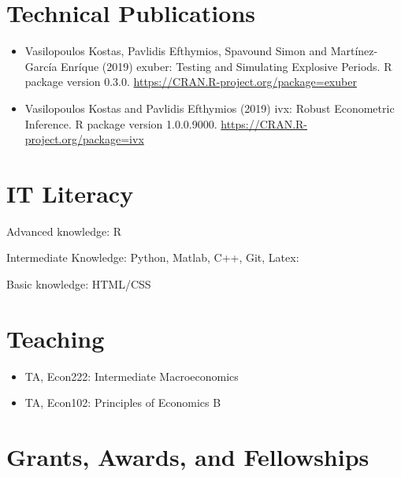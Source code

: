 \documentclass[10pt,]{article}
\begin{document}
              \hypertarget{technical-publications}{%
              \section{Technical Publications}\label{technical-publications}}
              
              \begin{itemize}
              \item
                Vasilopoulos Kostas, Pavlidis Efthymios, Spavound Simon and
                Martínez-García Enríque (2019) exuber: Testing and Simulating
                Explosive Periods. R package version 0.3.0.
                \url{https://CRAN.R-project.org/package=exuber}
              \item
                Vasilopoulos Kostas and Pavlidis Efthymios (2019) ivx: Robust
                Econometric Inference. R package version 1.0.0.9000.
                \url{https://CRAN.R-project.org/package=ivx}
              \end{itemize}
              
              \hypertarget{it-literacy}{%
              \section{IT Literacy}\label{it-literacy}}
              
              Advanced knowledge: R
              
              Intermediate Knowledge: Python, Matlab, C++, Git, Latex:
              
              Basic knowledge: HTML/CSS
              
              \hypertarget{teaching}{%
              \section{Teaching}\label{teaching}}
              
              \begin{itemize}
              \item
                TA, Econ222: Intermediate Macroeconomics
              \item
                TA, Econ102: Principles of Economics B
              \end{itemize}
              
              \hypertarget{grants-awards-and-fellowships}{%
              \section{Grants, Awards, and
              Fellowships}\label{grants-awards-and-fellowships}}
              
\end{document}
